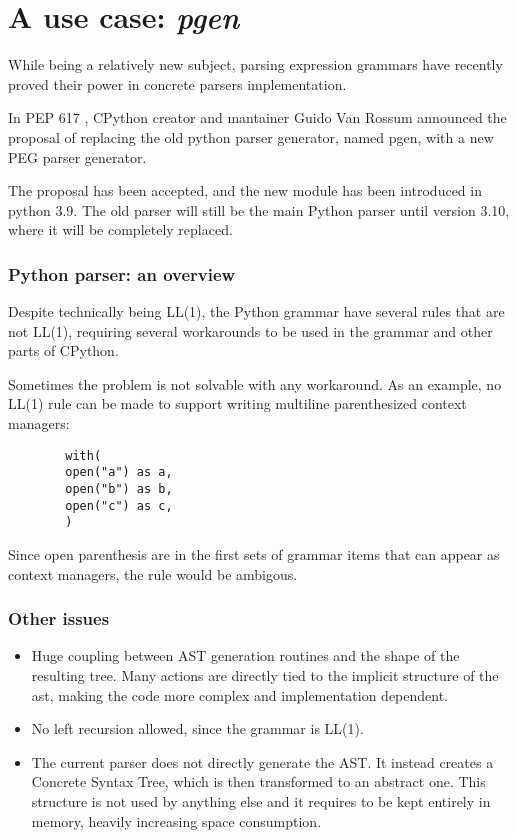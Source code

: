 \section{A use case: \emph{pgen}}
\begin{frame}
    While being a relatively new subject, parsing expression grammars have recently proved their  power in concrete parsers implementation.
    
    \begin{block}{}
    	In PEP 617 \cite{python}, CPython creator and mantainer Guido Van Rossum announced the proposal of replacing the old python parser generator, named pgen, with a new PEG parser generator.
    \end{block}
	\begin{block}{}
		The proposal has been accepted, and the new module has been introduced in python 3.9. The old parser will still be the main Python parser until version 3.10, where it will be completely replaced.
	\end{block}
\end{frame}

\begin{frame}[fragile]
	\small
	\frametitle{Python parser: an overview}
	Despite technically being LL(1), the Python grammar have several rules that are not LL(1), requiring several workarounds to be used in the grammar and other parts of CPython.  

		Sometimes the problem is not solvable with any workaround. As an example, no LL(1) rule can be made to support writing multiline parenthesized context managers:
		\begin{verbatim}
		with(
		open("a") as a,
		open("b") as b,
		open("c") as c,
		)
		\end{verbatim}

Since open parenthesis are in the first sets of grammar items that can appear as context managers, the rule would be ambigous.
\end{frame}

\begin{frame}
	\frametitle{Other issues}
	\begin{itemize}
		\item Huge coupling between AST generation routines and the shape of the resulting tree. Many actions are directly tied to the implicit structure of the ast, making the code more complex and implementation dependent.
		\item No left recursion allowed, since the grammar is LL(1).
		
		\item The current parser does not directly generate the AST. It instead creates a Concrete Syntax Tree, which is then  transformed to an abstract one. This structure is not used by anything else and it requires to be kept entirely in memory, heavily  increasing space consumption.
	\end{itemize}
\end{frame}

